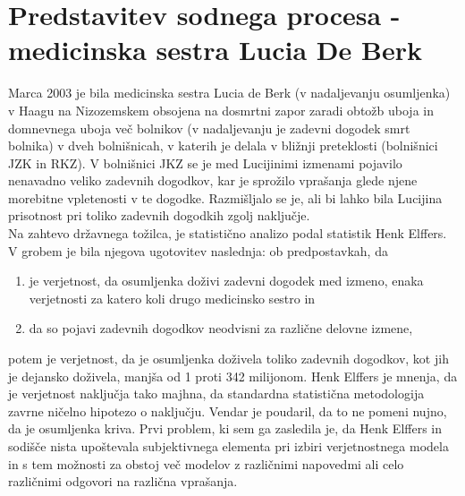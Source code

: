 \documentclass[fin1, tisk]{fmfdelo}
\theoremstyle{definition}
\theoremstyle{trditev}
\theoremstyle{izrek}
\begin{document}
\section{Predstavitev sodnega procesa - medicinska sestra Lucia De Berk}
Marca 2003 je bila medicinska sestra Lucia de Berk (v nadaljevanju osumljenka) v Haagu na Nizozemskem obsojena na dosmrtni zapor zaradi obtožb 
uboja in domnevnega uboja več bolnikov (v nadaljevanju je zadevni dogodek smrt bolnika) v dveh bolnišnicah, v katerih je delala v bližnji preteklosti (bolnišnici JZK in RKZ). V bolnišnici JKZ 
se je med Lucijinimi izmenami pojavilo nenavadno veliko zadevnih dogodkov, kar je sprožilo vprašanja glede njene morebitne vpletenosti v te dogodke. 
Razmišljalo se je, ali bi lahko bila Lucijina prisotnost pri toliko zadevnih dogodkih zgolj naključje.\\
Na zahtevo državnega tožilca, je statistično analizo podal statistik Henk Elffers. V grobem je bila njegova ugotovitev naslednja: ob predpostavkah, da
\begin{enumerate}
    \item je verjetnost, da osumljenka doživi zadevni dogodek med izmeno, enaka verjetnosti za katero koli drugo medicinsko sestro in
    \item da so pojavi zadevnih dogodkov neodvisni za različne delovne izmene,
\end{enumerate}
potem je verjetnost, da je osumljenka doživela toliko zadevnih dogodkov, kot jih je dejansko doživela, manjša od 1 proti 342 milijonom. Henk Elffers je mnenja, 
da je verjetnost naključja tako majhna, da standardna statistična metodologija zavrne ničelno hipotezo o naključju. Vendar je poudaril, da 
to ne pomeni nujno, da je osumljenka kriva. Prvi problem, ki sem ga zasledila je, da Henk Elffers in sodišče nista upoštevala subjektivnega 
elementa pri izbiri verjetnostnega modela in s tem možnosti za obstoj več modelov z različnimi napovedmi ali celo različnimi odgovori 
na različna vprašanja. 

\end{document}
